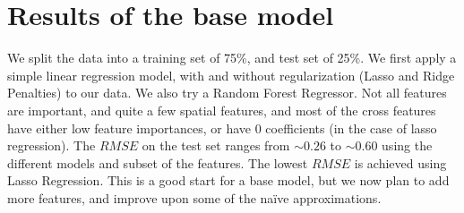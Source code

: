 \documentclass[11pt]{article}
\begin{document}
\section{Results of the base model}
We split the data into a training set of 75\%, and test set of 25\%. We first apply a simple linear regression model, with and without regularization (Lasso and Ridge Penalties) to our data. We also try a Random Forest Regressor. Not all features are important, and quite a few spatial features, and most of the cross features have either low feature importances, or have 0 coefficients (in the case of lasso regression). The $\mathit{RMSE}$ on the test set ranges from $\sim0.26$ to $\sim0.60$ using the different models and subset of the features. The lowest $\mathit{RMSE}$ is achieved using Lasso Regression. This is a good start for a base model, but we now plan to add more features, and improve upon some of the na\"ive approximations.
\end{document}
